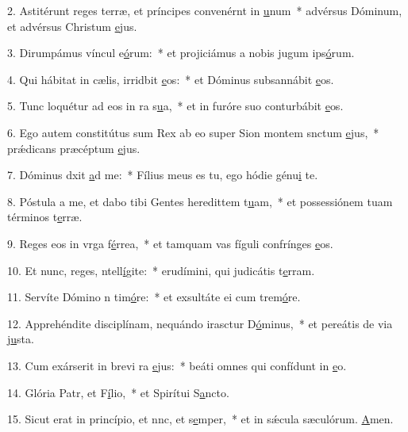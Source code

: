 2. Astitérunt reges terræ, et príncipes convenérnt in \uline{u}num~* advérsus Dóminum, et advérsus Christum \uline{e}jus.\par 
3. Dirumpámus víncul e\uline{ó}rum:~* et projiciámus a nobis jugum ips\uline{ó}rum.\par 
4. Qui hábitat in cælis, irridbit \uline{e}os:~* et Dóminus subsannábit \uline{e}os.\par 
5. Tunc loquétur ad eos in ra s\uline{u}a,~* et in furóre suo conturbábit \uline{e}os.\par 
6. Ego autem constitútus sum Rex ab eo super Sion montem snctum \uline{e}jus,~* prǽdicans præcéptum \uline{e}jus.\par 
7. Dóminus dxit \uline{a}d me:~* Fílius meus es tu, ego hódie génu\uline{i} te.\par 
8. Póstula a me, et dabo tibi Gentes heredittem t\uline{u}am,~* et possessiónem tuam términos t\uline{e}rræ.\par 
9. Reges eos in vrga f\uline{é}rrea,~* et tamquam vas fíguli confrínges \uline{e}os.\par 
10. Et nunc, reges, ntell\uline{í}gite:~* erudímini, qui judicátis t\uline{e}rram.\par 
11. Servíte Dómino n tim\uline{ó}re:~* et exsultáte ei cum trem\uline{ó}re.\par 
12. Apprehéndite disciplínam, nequándo irasctur D\uline{ó}minus,~* et pereátis de via j\uline{u}sta.\par 
13. Cum exárserit in brevi ra \uline{e}jus:~* beáti omnes qui confídunt in \uline{e}o.\par 
14. Glória Patr, et F\uline{í}lio,~* et Spirítui S\uline{a}ncto.\par 
15. Sicut erat in princípio, et nnc, et s\uline{e}mper,~* et in sǽcula sæculórum. \uline{A}men.\par 

